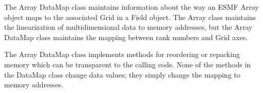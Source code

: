 

The Array DataMap class maintains information about the way an ESMF Array
object maps to the associated Grid in a Field object.  The Array class
maintains the linearization of multidimensional data to memory addresses,
but the Array DataMap class maintains the mapping between rank numbers and
Grid axes.

The Array DataMap class implements methods for reordering or repacking
memory which can be transparent to the calling code.  None of the
methods in the DataMap class change data values; they simply
change the mapping to memory addresses.


